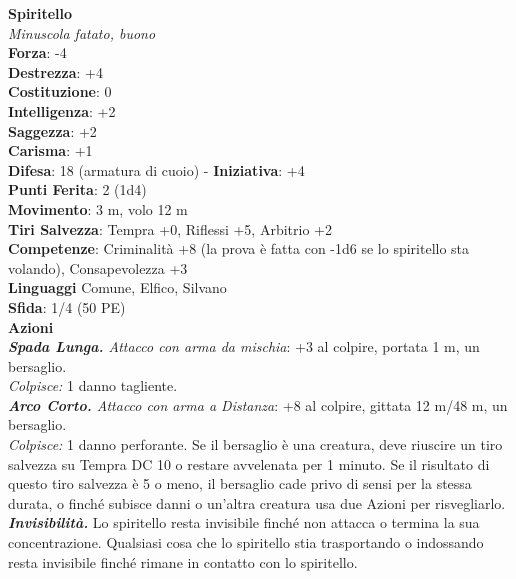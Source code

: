 \begin{multicols}{2}
\medskip\textbf{Spiritello}\\
\emph{Minuscola fatato, buono}\\
\textbf{Forza}: -4\\
\textbf{Destrezza}: +4\\
\textbf{Costituzione}: 0\\
\textbf{Intelligenza}: +2\\
\textbf{Saggezza}: +2\\
\textbf{Carisma}: +1\\
\textbf{Difesa}: 18 (armatura di cuoio) - \textbf{Iniziativa}: +4\\
\textbf{Punti Ferita}: 2 (1d4)\\
\textbf{Movimento}: 3 m, volo 12 m\\
\textbf{Tiri Salvezza}: Tempra +0, Riflessi +5, Arbitrio +2\\
\textbf{Competenze}: Criminalità +8 (la prova è fatta con -1d6 se lo spiritello sta volando), Consapevolezza +3\\
\textbf{Linguaggi} Comune, Elfico, Silvano\\
\textbf{Sfida}: 1/4 (50 PE)\smallskip\\
\smallskip\textbf{Azioni}\\
\emph{\textbf{Spada Lunga.} Attacco con arma da mischia}: +3 al colpire, portata 1 m, un bersaglio.\\
\emph{Colpisce:} 1 danno tagliente.\\
\emph{\textbf{Arco Corto.} Attacco con arma a Distanza}: +8 al colpire, gittata 12 m/48 m, un bersaglio.\\

\emph{Colpisce:} 1 danno perforante. Se il bersaglio è una creatura, deve riuscire un tiro salvezza su Tempra DC 10 o restare avvelenata per 1 minuto. Se il risultato di questo tiro salvezza è 5 o meno, il bersaglio cade privo di sensi per la stessa durata, o finché subisce danni o un'altra creatura usa due Azioni per risvegliarlo.\\

\emph{\textbf{Invisibilità.}} Lo spiritello resta invisibile finché non attacca o termina la sua concentrazione. Qualsiasi cosa che lo spiritello stia trasportando o indossando resta invisibile finché rimane in contatto con lo spiritello.\\


\end{multicols}
